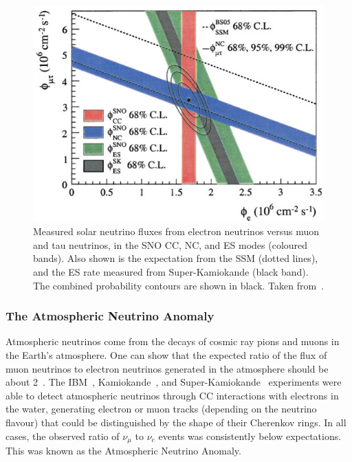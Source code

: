 \begin{figure}
    \centering
    \includegraphics[width=\textwidth]{1_NeutrinoTheory/Figs/sno_vs_ssm_comparison.png}
    \caption[Comparison of measured solar neutrino fluxes in the SNO CC, NC, and ES modes to the SSM]
    {Measured solar neutrino fluxes from electron neutrinos versus muon and tau neutrinos, in the SNO CC, NC, and ES modes (coloured bands). Also shown is the expectation from the SSM (dotted lines), and the ES rate measured from Super-Kamiokande (black band). The combined probability contours are shown in black. Taken from~\cite{aharmimElectronEnergySpectra2005}.}
    \label{fig:sno_flux_results}
\end{figure}


\subsubsection{The Atmospheric Neutrino Anomaly}
Atmospheric neutrinos come from the decays of cosmic ray pions and muons in the Earth's atmosphere. One can show that the expected ratio of the flux of muon neutrinos to electron neutrinos generated in the atmosphere should be about 2~\cite{fukudaEvidenceOscillationAtmospheric1998}. %
The IBM~\cite{becker-szendyElectronMuonneutrinoContent1992}, %
Kamiokande~\cite{fukudaAtmosphericVmveRatio1994}, %
and Super-Kamiokande~\cite{fukudaEvidenceOscillationAtmospheric1998} %
experiments were able to detect atmospheric neutrinos through CC interactions with electrons in the water, generating electron or muon tracks (depending on the neutrino flavour) that could be distinguished by the shape of their Cherenkov rings. In all cases, the observed ratio of $\nu_{\mu}$ to $\nu_{e}$ events was consistently below expectations. This was known as the Atmospheric Neutrino Anomaly.

